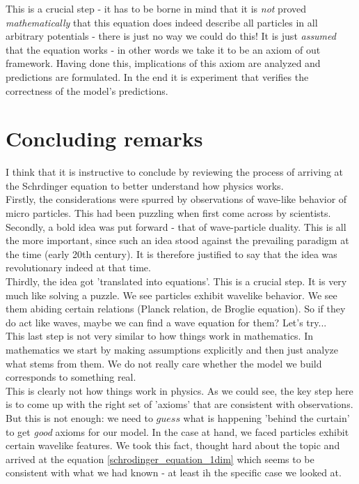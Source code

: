 \documentclass[12pt]{article}
\begin{document}
This is a crucial step - it has to be borne in mind that it is 
\textit{not} proved \textit{mathematically} that this equation does indeed describe all particles in all arbitrary potentials - there is just no way we could do this! It is just \textit{assumed} that the equation works - in other words we take it to be an axiom of out framework. 
Having done this, implications of this axiom are analyzed and predictions are formulated. In the end it is experiment that verifies the correctness of the model's predictions.


\section{Concluding remarks}
I think that it is instructive to conclude by reviewing the process of arriving at the Schrdinger equation to better understand how physics works.
\\ \indent Firstly, the considerations were spurred by observations of wave-like behavior of micro particles. This had been puzzling when first come across by scientists.
\\ \indent Secondly, a bold idea was put forward - that of wave-particle duality. This is all the more important, since such an idea stood against the prevailing paradigm at the time (early 20th century). It is therefore justified to say that the idea was revolutionary indeed at that time.
\\ \indent Thirdly, the idea got 'translated into equations'. This is a crucial step. It is very much like solving a puzzle. We see particles exhibit wavelike behavior. We see them abiding certain relations (Planck relation, de Broglie equation). So if they do act like waves, maybe we can find a wave equation for them? Let's try...
\\ \indent This last step is not very similar to how things work in mathematics. In mathematics we start by making assumptions explicitly and then just analyze what stems from them. We do not really care whether the model we build corresponds to something real.
\\ \indent This is clearly not how things work in physics. As we could see, the key step here is to come up with the right set of 'axioms' that are consistent with observations. But this is not enough: we need to $guess$ what is happening 'behind the curtain' to get \textit{good} axioms for our model. In the case at hand, we faced particles exhibit certain wavelike features. We took this fact, thought hard about the topic and arrived at the equation \eqref{schrodinger_equation_1dim} which seems to be consistent with what we had known - at least ih the specific case we looked at. 
\end{document}
